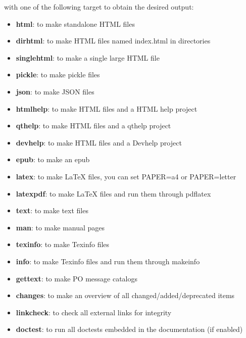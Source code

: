 \documentclass[a4paper,11pt,oneside]{sphinxmanual}
\begin{document}
with one of the following target to obtain the desired output:
\begin{itemize}
\item {} 
\textbf{html}: to make standalone HTML files

\item {} 
\textbf{dirhtml}: to make HTML files named index.html in directories

\item {} 
\textbf{singlehtml}: to make a single large HTML file

\item {} 
\textbf{pickle}: to make pickle files

\item {} 
\textbf{json}: to make JSON files

\item {} 
\textbf{htmlhelp}: to make HTML files and a HTML help project

\item {} 
\textbf{qthelp}: to make HTML files and a qthelp project

\item {} 
\textbf{devhelp}: to make HTML files and a Devhelp project

\item {} 
\textbf{epub}: to make an epub

\item {} 
\textbf{latex}: to make LaTeX files, you can set PAPER=a4 or PAPER=letter

\item {} 
\textbf{latexpdf}: to make LaTeX files and run them through pdflatex

\item {} 
\textbf{text}: to make text files

\item {} 
\textbf{man}: to make manual pages

\item {} 
\textbf{texinfo}: to make Texinfo files

\item {} 
\textbf{info}: to make Texinfo files and run them through makeinfo

\item {} 
\textbf{gettext}: to make PO message catalogs

\item {} 
\textbf{changes}: to make an overview of all changed/added/deprecated items

\item {} 
\textbf{linkcheck}: to check all external links for integrity

\item {} 
\textbf{doctest}: to run all doctests embedded in the documentation (if enabled)

\end{itemize}
\end{document}
